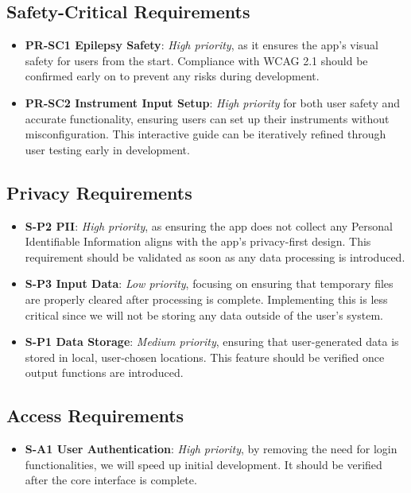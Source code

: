 \documentclass{article}
\begin{document}
\subsection{Safety-Critical Requirements}
\begin{itemize}
    \item \textbf{PR-SC1 Epilepsy Safety}: \textit{High priority}, as it ensures the app’s visual safety for users from the start. Compliance with WCAG 2.1 should be confirmed early on to prevent any risks during development. \label{PR-SC1}
    \item \textbf{PR-SC2 Instrument Input Setup}: \textit{High priority} for both user safety and accurate functionality, ensuring users can set up their instruments without misconfiguration. This interactive guide can be iteratively refined through user testing early in development. \label{PR-SC2}
\end{itemize}

\subsection{Privacy Requirements}
\begin{itemize}
    \item \textbf{S-P2 PII}: \textit{High priority}, as ensuring the app does not collect any Personal Identifiable Information aligns with the app’s privacy-first design. This requirement should be validated as soon as any data processing is introduced.
    \item \textbf{S-P3 Input Data}: \textit{Low priority}, focusing on ensuring that temporary files are properly cleared after processing is complete. Implementing this is less critical since we will not be storing any data outside of the user’s system.
    \item \textbf{S-P1 Data Storage}: \textit{Medium priority}, ensuring that user-generated data is stored in local, user-chosen locations. This feature should be verified once output functions are introduced. \label{S-P1}
\end{itemize}

\subsection{Access Requirements}
\begin{itemize}
    \item \textbf{S-A1 User Authentication}: \textit{High priority}, by removing the need for login functionalities, we will speed up initial development. It should be verified after the core interface is complete.
\end{itemize}
\end{document}
